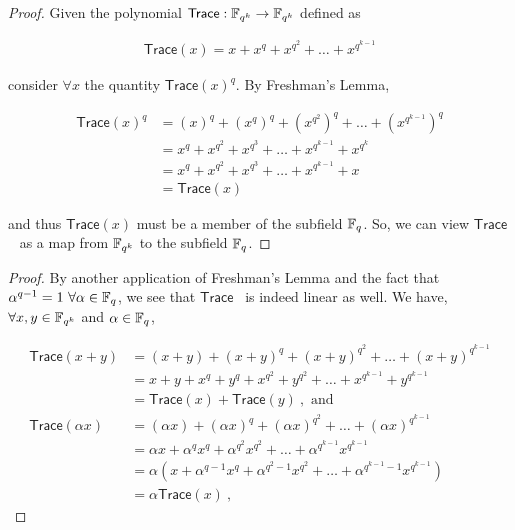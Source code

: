 \question

\newcommand{\tracemap}[0]{\ensuremath{\textsf{Trace}}}

\begin{alphaparts}

    \questionpart

    
    \begin{proof}
        Given the polynomial \(\tracemap : \field_{q^k} \to \field_{q^k}\) defined as 
    
        \begin{gather*}
            \tracemap(x) = x + x^q + x^{q^2} + \ldots + x^{q^{k-1}}
        \end{gather*}
    
        consider \(\forall x\) the quantity \(\tracemap(x)^q\). By Freshman's Lemma,
    
        \begin{align*}
            \tracemap(x)^q &= (x)^q + (x^q)^q + (x^{q^2})^q + \ldots + (x^{q^{k-1}})^q \\
                        &= x^q + x^{q^2} + x^{q^3} + \ldots + x^{q^{k-1}} + x^{q^{k}} \\
                        &= x^q + x^{q^2} + x^{q^3} + \ldots + x^{q^{k-1}} + x \\
                        &= \tracemap(x)
        \end{align*}
    
        and thus \(\tracemap(x)\) must be a member of the subfield \(\mathbb{F}_q\). So,
        we can view \tracemap~ as a map from \(\mathbb{F}_{q^k}\) to the subfield
        \(\mathbb{F}_q\).
    \end{proof}

    \questionpart

    
    \begin{proof}
        By another application of Freshman's Lemma and the fact that \(\alpha^{q-1}
        = 1 ~\forall \alpha \in \mathbb{F}_q\), we see that \tracemap~ is indeed linear
        as well. We have, \(\forall x, y \in \mathbb{F}_{q^k}\) and \(\alpha \in
        \mathbb{F}_q\),
    
        \begin{align*}
            \tracemap(x + y) &= (x+y) + (x+y)^q + (x+y)^{q^2} + \ldots + (x+y)^{q^{k-1}} \\
                             &= x + y + x^q + y^q + x^{q^2} + y^{q^2} + \ldots + x^{q^{k-1}} + y^{q^{k-1}}\\
                             &= \tracemap(x) + \tracemap(y)~, \text{ and}\\
            \tracemap(\alpha x) &= (\alpha x) + (\alpha x)^q + (\alpha x)^{q^2} + \ldots + (\alpha x)^{q^{k-1}} \\
                                &= \alpha x + \alpha^q x^q + \alpha^{q^2} x^{q^2} + \ldots + \alpha^{q^{k-1}}x^{q^{k-1}} \\
                                &= \alpha (x + \alpha^{q-1} x^q + \alpha^{q^2-1} x^{q^2} + \ldots + \alpha^{q^{k-1}-1}x^{q^{k-1}}) \\
                                &= \alpha \tracemap(x)~,
        \end{align*}
    

\end{proof}
\end{alphaparts}
